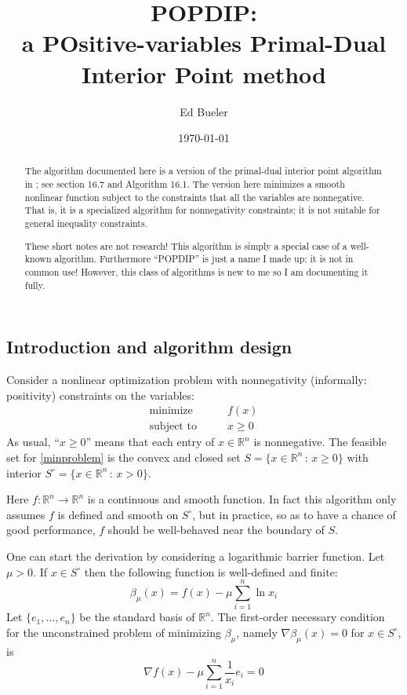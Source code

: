 \documentclass[11pt]{article}
\title{POPDIP: \\ a POsitive-variables Primal-Dual Interior Point method}
\author{Ed Bueler}
\date{\today}
\newcommand{\RR}{\mathbb{R}}
\newcommand{\grad}{\nabla}
\begin{document}
\maketitle

\begin{abstract}
The algorithm documented here is a version of the primal-dual interior point algorithm in \cite{GrivaNashSofer2009}; see section 16.7 and Algorithm 16.1.  The version here minimizes a smooth nonlinear function subject to the constraints that all the variables are nonnegative.  That is, it is a specialized algorithm for nonnegativity constraints; it is not suitable for general inequality constraints.

These short notes are not research!  This algorithm is simply a special case of a well-known algorithm.  Furthermore ``POPDIP'' is just a name I made up; it is not in common use!  However, this class of algorithms is new to me so I am documenting it fully.
\end{abstract}

\thispagestyle{empty}

\bigskip
\subsection*{Introduction and algorithm design}

Consider a nonlinear optimization problem with nonnegativity (informally: positivity) constraints on the variables:
\begin{equation}
\begin{matrix}
\text{minimize} \qquad & f(x) \\
\text{subject to} \qquad & x \ge 0
\end{matrix} \label{minproblem}
\end{equation}
As usual, ``$x\ge 0$'' means that each entry of $x\in\RR^n$ is nonnegative.  The feasible set for \eqref{minproblem} is the convex and closed set $S = \{x\in \RR^n\,:\,x\ge 0\}$ with interior $S^\circ = \{x\in \RR^n\,:\,x > 0\}$.

Here $f:\RR^n \to\RR^n$ is a continuous and smooth function.  In fact this algorithm only assumes $f$ is defined and smooth on $S^\circ$, but in practice, so as to have a chance of good performance, $f$ should be well-behaved near the boundary of $S$.

One can start the derivation by considering a logarithmic barrier function.  Let $\mu>0$.  If $x\in S^\circ$ then the following function is well-defined and finite:
\begin{equation}
\beta_\mu(x) = f(x) - \mu \sum_{i=1}^n \ln x_i \label{barrierfunction}
\end{equation}
Let $\{e_1,\dots,e_n\}$ be the standard basis of $\RR^n$.  The first-order necessary condition for the unconstrained problem of minimizing $\beta_\mu$, namely $\grad \beta_\mu(x)=0$ for $x \in S^\circ$, is
\begin{equation}
\grad f(x) - \mu \sum_{i=1}^n \frac{1}{x_i} e_i = 0 \label{firstorderbarrier}
\end{equation}
\end{document}
